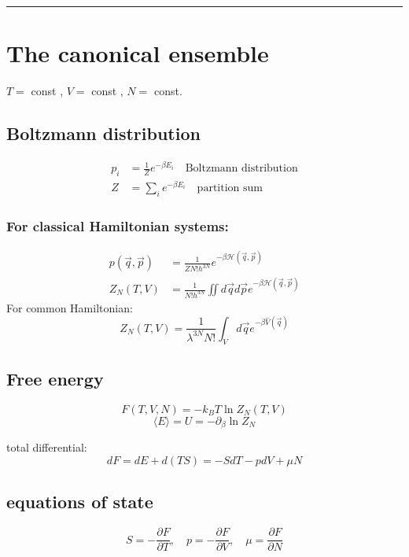 \noindent\rule[1ex]{\textwidth/5}{1pt}
\section{The canonical ensemble}
$T=$ const , $V=$ const , $N=$ const.


\subsection*{Boltzmann distribution}

\[
    \begin{aligned}
        p_i &= \frac{1}{Z} e^{- \beta E_i} \quad \text{Boltzmann distribution} \\
        Z &= \sum_i e^{- \beta E_i} \quad \text{partition sum}
    \end{aligned}
\]

\subsubsection*{For classical Hamiltonian systems:}
\[
    \begin{aligned}
        p(\vec{q}, \vec{p}) &= \frac{1}{Z N! h^{3N}} e^{- \beta \mathcal{H}(\vec{q},\vec{p})} \\
        Z_N (T,V) &= \frac{1}{N! h^{3N}} \iint d\vec{q} d\vec{p} e^{- \beta \mathcal{H}(\vec{q},\vec{p})}
    \end{aligned}
\]
For common Hamiltonian:
\[
    Z_N (T,V) = \frac{1}{\lambda^{3N}N!} \int_V d\vec{q} e^{-\beta \hat{V}(\vec{q})}
\]

\subsection*{Free energy}
\[
    F(T,V,N) = -k_B T \ln Z_N (T,V)
\]
\[
    \langle E \rangle = U = - \partial_\beta \ln Z_N 
\]

total differential:
\[
    dF = dE +d(TS) = -SdT - pdV + \mu N
\]

\subsection*{equations of state}
\[
    S = - \frac{\partial F}{\partial T}, \quad p = - \frac{\partial F}{\partial V}, \quad \mu = \frac{\partial F}{\partial N}
\]

